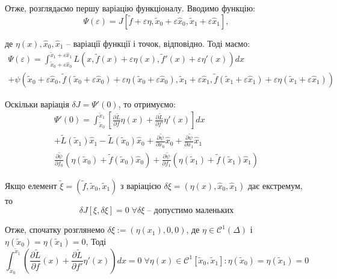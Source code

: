 \documentclass[14pt]{extarticle}
\newcommand{\<}{\langle}
\renewcommand{\>}{\rangle}
\theoremstyle{mystyle}{\newtheorem{definition}{Definition}[section]}
\theoremstyle{mystyle}{\newtheorem{proposition}[definition]{Proposition}}
\theoremstyle{mystyle}{\newtheorem{theorem}[definition]{Theorem}}
\theoremstyle{mystyle}{\newtheorem{lemma}[definition]{Lemma}}
\theoremstyle{mystyle}{\newtheorem{corollary}[definition]{Corollary}}
\theoremstyle{mystyle}{\newtheorem*{remark}{Remark}}
\theoremstyle{mystyle}{\newtheorem*{remarks}{Remarks}}
\theoremstyle{mystyle}{\newtheorem*{example}{Example}}
\theoremstyle{mystyle}{\newtheorem*{examples}{Examples}}
\theoremstyle{definition}{\newtheorem*{exercise}{Exercise}}
\theoremstyle{cstyle}{\newtheorem*{cthm}{}}
\theoremstyle{warn}
\begin{document}
Отже, розглядаємо першу варіацію функціоналу. Вводимо функцію:
\begin{equation}
    \Psi(\varepsilon) = J[\widetilde{f}+\varepsilon\eta, \widetilde{x}_0+\varepsilon\hat{x}_0, \widetilde{x}_1+\varepsilon\hat{x}_1],
\end{equation}

де $\eta(x),\hat{x}_0,\hat{x}_1$ -- варіації функції і точок, відповідно. Тоді маємо:
\begin{gather}
    \Psi(\varepsilon) = \int_{\widetilde{x}_0+\varepsilon\hat{x}_0}^{\widetilde{x}_1+\varepsilon\hat{x}_1}L(x,\widetilde{f}(x)+\varepsilon\eta(x),\widetilde{f}'(x)+\varepsilon\eta'(x))dx \nonumber\\
    + \psi(\widetilde{x}_0+\varepsilon\hat{x}_0, \widetilde{f}(\widetilde{x}_0+\varepsilon\hat{x}_0)+\varepsilon\eta(\widetilde{x}_0+\varepsilon\hat{x}_0), \widetilde{x}_1+\varepsilon\hat{x}_1, \widetilde{f}(\widetilde{x}_1+\varepsilon\hat{x}_1)+\varepsilon\eta(\widetilde{x}_1+\varepsilon\hat{x}_1))
\end{gather}

Оскільки варіація $\delta J = \Psi'(0)$, то отримуємо:
\begin{gather}
    \Psi'(0) = \int_{\widetilde{x}_0}^{\widetilde{x}_1}\left[\frac{\partial\widetilde{L}}{\partial f}\eta(x)+\frac{\partial \widetilde{L}}{\partial f'}\eta'(x)\right]dx \nonumber \\
    +\widetilde{L}(\widetilde{x}_1)\hat{x}_1 - \widetilde{L}(\widetilde{x}_0)\hat{x}_0+\frac{\partial\widetilde{\psi}}{\partial x_0}\hat{x}_0 + \frac{\partial \widetilde{\psi}}{\partial x_1}\hat{x}_1 \nonumber\\
    \frac{\partial \widetilde{\psi}}{\partial f_0}(\eta(\widetilde{x}_0)+\widetilde{f}(\widetilde{x}_0)\hat{x}_0)+\frac{\partial \widetilde{\psi}}{\partial f_1}(\eta(\widetilde{x}_1)+\widetilde{f}(\widetilde{x}_1)\hat{x}_1)
\end{gather}

Якщо елемент $\widetilde{\xi}=(\widetilde{f},\widetilde{x}_0,\widetilde{x}_1)$ з варіацією $\delta \xi = (\eta(x),\hat{x}_0,\hat{x}_1)$ дає екстремум, то
\begin{equation}
    \delta J[\xi, \delta \xi] = 0 \; \forall \delta\xi \; \text{-- допустимо маленьких}
\end{equation}

Отже, спочатку розглянемо $\delta\xi := (\eta(x_1),0,0)$, де $\eta \in \mathcal{C}^1(\Delta)$ і $\eta(\widetilde{x}_0)=\eta(\widetilde{x}_1)=0$, Тоді
\begin{equation}
    \int_{\widetilde{x}_0}^{\widetilde{x}_1}\left(\frac{\partial\widetilde{L}}{\partial f}(x)+\frac{\partial\widetilde{L}}{\partial f'}\eta'(x)\right)dx = 0 \; \forall \eta(x) \in \mathcal{C}^1[\widetilde{x}_0,\widetilde{x}_1]: \eta(\widetilde{x}_0)=\eta(\widetilde{x}_1)=0
\end{equation}
\end{document}

